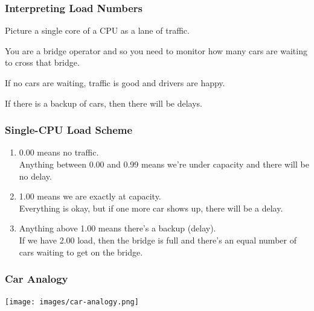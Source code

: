 \begin{frame}
\frametitle{Interpreting Load Numbers}


\begin{changemargin}{1cm}
Picture a single core of a CPU as a lane of traffic. 

You are a bridge operator and so you need to monitor how many cars are waiting to cross that bridge. 

If no cars are waiting, traffic is good and drivers are happy. 

If there is a backup of cars, then there will be delays.
\end{changemargin}

\end{frame}



\begin{frame}
\frametitle{Single-CPU Load Scheme}


\begin{changemargin}{1cm}
\begin{enumerate}
	\item 0.00 means no traffic. \\
    Anything between 0.00 and 0.99 means we're under capacity and there will be no delay.\\[1em]
	\item 1.00 means we are exactly at capacity. \\
    Everything is okay, but if one more car shows up, there will be a delay.\\[1em]
	\item Anything above 1.00 means there's a backup (delay). \\
    If we have 2.00 load, then the bridge is full and there's an equal number of cars waiting to get on the bridge. 
\end{enumerate}
\end{changemargin}

\end{frame}



\begin{frame}
\frametitle{Car Analogy}

\begin{center}
	\texttt{[image: images/car-analogy.png]}
\end{center}

\end{frame}



